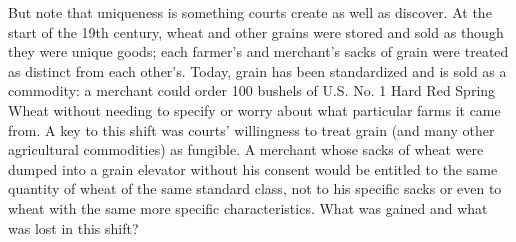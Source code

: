 But note that uniqueness is something courts create as well as discover. At the
start of the 19th century, wheat and other grains were stored and sold as
though they were unique goods; each farmer's and merchant's sacks of grain were
treated as distinct from each other's. Today, grain has been standardized and
is sold as a commodity: a merchant could order 100 bushels of U.S. No. 1 Hard
Red Spring Wheat without needing to specify or worry about what particular
farms it came from. A key to this shift was courts' willingness to treat grain
(and many other agricultural commodities) as fungible. A merchant whose sacks
of wheat were dumped into a grain elevator without his consent would be
entitled to the same quantity of wheat of the same standard class, not to his
specific sacks or even to wheat with the same more specific characteristics.
What was gained and what was lost in this shift?

